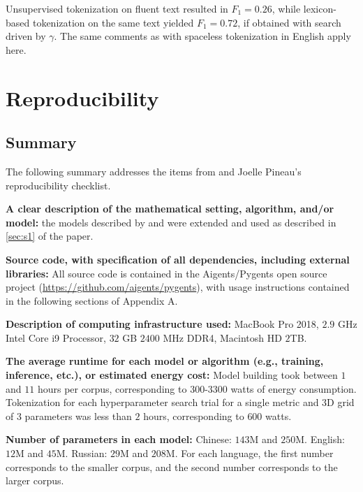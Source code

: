 \documentclass[11pt]{article}
\begin{document}
Unsupervised tokenization on fluent text resulted in $F_1=0.26$, while lexicon-based tokenization on the same text yielded $F_1=0.72$, if obtained with search driven by $\gamma$. The same comments as with spaceless tokenization in English apply here.

\section{Reproducibility}

\subsection{Summary}

The following summary addresses the items from \citet{19} and Joelle Pineau’s reproducibility checklist.

\textbf{A clear description of the mathematical setting, algorithm, and/or model:} the models described by \citet{11} and \citet{12} were extended and used as described in \autoref{sec:s1} of the paper.

\textbf{Source code, with specification of all dependencies, including external libraries:} All source code is contained in the Aigents/Pygents open source project (\url{https://github.com/aigents/pygents}), with usage instructions contained in the following sections of Appendix A. 

\textbf{Description of computing infrastructure used:} MacBook Pro 2018, $2.9$ GHz Intel Core i9 Processor, $32$ GB $2400$ MHz DDR4, Macintosh HD $2$TB.

\textbf{The average runtime for each model or algorithm (e.g., training, inference, etc.), or estimated energy cost:} Model building took between $1$ and $11$ hours per corpus, corresponding to $300$-$3300$ watts of energy consumption. Tokenization for each hyperparameter search trial for a single metric and 3D grid of $3$ parameters was less than $2$ hours, corresponding to $600$ watts.

\textbf{Number of parameters in each model:} Chinese: $143$M and $250$M. English: $12$M and $45$M. Russian: $29$M and $208$M. For each language, the first number corresponds to the smaller corpus, and the second number corresponds to the larger corpus.
\end{document}

